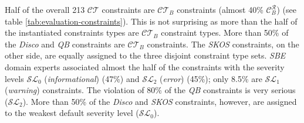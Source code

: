 \documentclass{llncs}
\begin{document}
{Half of the overall 213 $\mathcal{CT}$ constraints are $\mathcal{CT}_{B}$ constraints (almost 40\% $\mathcal{C}_B ^{\mathcal{R}}$) (see table \ref{tab:evaluation-constraints}).
This is not surprising as more than the half of the instantiated constraints types are $\mathcal{CT}_{B}$ constraint types.
More than 50\% of the \emph{Disco} and \emph{QB} constraints are $\mathcal{CT}_{B}$ constraints.
The \emph{SKOS} constraints, on the other side, are equally assigned to the three disjoint constraint type sets. 
\emph{SBE} domain experts associated almost the half of the constraints with the severity levels $\mathcal{SL}_{0}$ (\emph{informational}) (47\%) and $\mathcal{SL}_{2}$ (\emph{error}) (45\%);
only 8.5\% are $\mathcal{SL}_{1}$ (\emph{warning}) constraints.
The violation of 80\% of the \emph{QB} constraints is very serious ($\mathcal{SL}_{2}$).
More than 50\% of the \emph{Disco} and \emph{SKOS} constraints, however, are assigned to the weakest default severity level ($\mathcal{SL}_{0}$).

}
\end{document}

